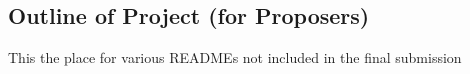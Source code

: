 \begin{draft}
\red

\section*{Outline of Project (for Proposers)}

This the place for various READMEs not included in the final submission

\renewcommand{\thepage}{\arabic{page}}
\setcounter{page}{1}
\black
\cleardoublepage
\end{draft}
